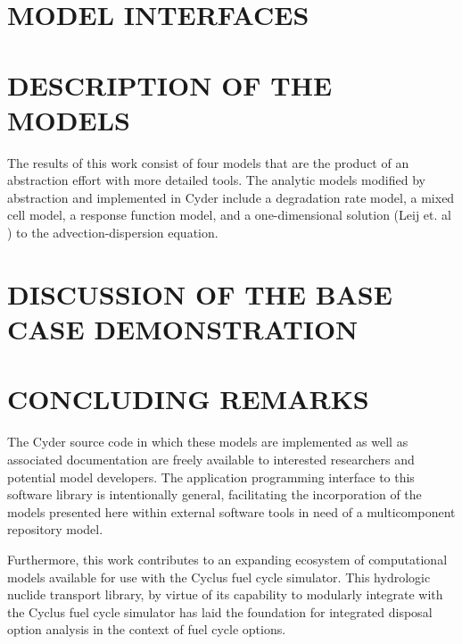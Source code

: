 \documentclass[letterpaper, 11pt]{article}
\begin{document}
\section*{MODEL INTERFACES}



\section*{DESCRIPTION OF THE MODELS}

The results of this work consist of four models that are the product of an 
abstraction effort with more detailed tools.  The analytic models modified by 
abstraction and implemented in Cyder include a degradation rate model, a mixed 
cell model, a response function model, and a one-dimensional solution (Leij et. 
al \cite{leij_analytical_1991}) to the advection-dispersion equation.










\section*{DISCUSSION OF THE BASE CASE DEMONSTRATION}


\section*{CONCLUDING REMARKS}
The Cyder source code in which these models are implemented as well as 
associated documentation are freely available to interested researchers and 
potential model developers. The application programming interface to this 
software library is intentionally general, facilitating the incorporation of the 
models presented here within external software tools in need of a multicomponent 
repository model.

Furthermore, this work contributes to an expanding ecosystem of computational 
models available for use with the Cyclus fuel cycle simulator. This hydrologic 
nuclide transport library, by virtue of its capability to modularly integrate 
with the Cyclus fuel cycle simulator has laid the foundation for integrated 
disposal option analysis in the context of fuel cycle options. 




\end{document}

